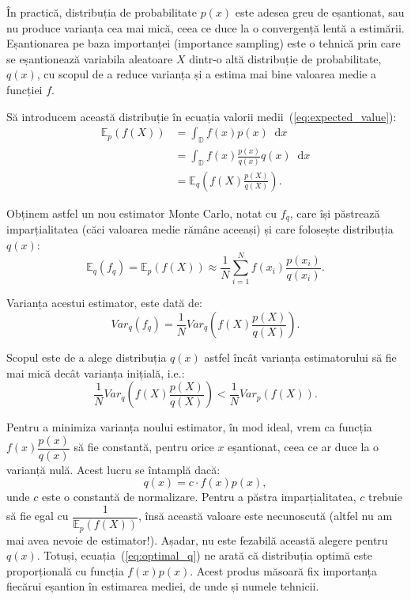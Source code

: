 \documentclass[12pt,a4paper]{report}
\newcommand*\diff{\mathop{}\!\mathrm{d}}
\numberwithin{equation}{section} %
\begin{document}
În practică, distribuția de probabilitate $p(x)$ este adesea greu de eșantionat,
sau nu produce varianța cea mai mică, ceea ce duce la o convergență lentă a
estimării.
Eșantionarea pe baza importanței (importance sampling) este o tehnică prin care
se eșantionează variabila aleatoare $X$ dintr-o altă distribuție de probabilitate,
$q(x)$, cu scopul de a reduce varianța și a estima mai bine valoarea medie a funcției
$f$.

Să introducem această distribuție în ecuația valorii medii~(\ref{eq:expected_value}):
\begin{equation}
	\begin{aligned}
		\mathbb{E}_p(f(X)) & = \int_{\mathbb{D}} f(x) p(x)\diff x                   \\
		                   & = \int_{\mathbb{D}} f(x) \frac{p(x)}{q(x)} q(x)\diff x \\
		                   & = \mathbb{E}_q\left(f(X) \frac{p(X)}{q(X)}\right).
	\end{aligned}
\end{equation}

Obținem astfel un nou estimator Monte Carlo, notat cu $f_q$, care își păstrează imparțialitatea
(căci valoarea medie rămâne aceeași) și care folosește distribuția $q(x)$:
\begin{equation}
	\mathbb{E}_q(f_q) = \mathbb{E}_p(f(X)) \approx \frac{1}{N} \sum_{i=1}^{N} f(x_i) \frac{p(x_i)}{q(x_i)}.
\end{equation}

Varianța acestui estimator, este dată de:
\begin{equation}
	Var_q(f_q) = \frac{1}{N}Var_q\left(f(X) \frac{p(X)}{q(X)}\right).
\end{equation}

Scopul este de a alege distribuția $q(x)$ astfel încât varianța estimatorului să fie
mai mică decât varianța inițială, i.e.:
\begin{equation}
	\frac{1}{N}Var_q\left(f(X) \frac{p(X)}{q(X)}\right) < \frac{1}{N}Var_p(f(X)).
\end{equation}

Pentru a minimiza varianța noului estimator, în mod ideal, vrem ca funcția
$f(x) \dfrac{p(x)}{q(x)}$ să fie constantă, pentru orice $x$ eșantionat, ceea
ce ar duce la o varianță nulă. Acest lucru se întamplă dacă:
\begin{equation}\label{eq:optimal_q}
	q(x) = c \cdot f(x)p(x),
\end{equation}
unde $c$ este o constantă de normalizare. Pentru a păstra imparțialitatea, $c$ trebuie
să fie egal cu $\dfrac{1}{\mathbb{E}_p(f(X))}$, însă această valoare este necunoscută
(altfel nu am mai avea nevoie de estimator!). Așadar, nu este fezabilă această alegere
pentru $q(x)$. Totuși, ecuația~(\ref{eq:optimal_q}) ne arată că distribuția
optimă este proporțională cu funcția $f(x)p(x)$. Acest produs măsoară fix
importanța fiecărui eșantion în estimarea mediei, de unde și numele tehnicii.
\end{document}
